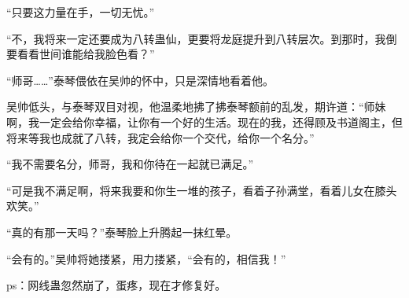 \begin{this_body}
“只要这力量在手，一切无忧。”

“不，我将来一定还要成为八转蛊仙，更要将龙庭提升到八转层次。到那时，我倒要看看世间谁能给我脸色看？”

“师哥……”泰琴偎依在吴帅的怀中，只是深情地看着他。

吴帅低头，与泰琴双目对视，他温柔地拂了拂泰琴额前的乱发，期许道：“师妹啊，我一定会给你幸福，让你有一个好的生活。现在的我，还得顾及书道阁主，但将来等我也成就了八转，我定会给你一个交代，给你一个名分。”

“我不需要名分，师哥，我和你待在一起就已满足。”

“可是我不满足啊，将来我要和你生一堆的孩子，看着子孙满堂，看着儿女在膝头欢笑。”

“真的有那一天吗？”泰琴脸上升腾起一抹红晕。

“会有的。”吴帅将她搂紧，用力搂紧，“会有的，相信我！”

ps：网线蛊忽然崩了，蛋疼，现在才修复好。

\end{this_body}

